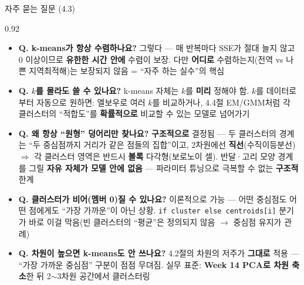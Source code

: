 \begin{frame}[shrink=6]{자주 묻는 질문 (4.3)}
\begin{center}\begin{varwidth}{0.92\textwidth}
  \small
  \begin{itemize}
    \item \textbf{Q. k-means가 항상 수렴하나요?}
      그렇다 --- 매 반복마다 SSE가 절대 늘지 않고 $0$ 이상이므로
      \textbf{유한한 시간 안에} 수렴이 보장. 다만
      \textbf{어디로} 수렴하는지(전역 vs 나쁜 지역최적해)는
      보장되지 않음 = ``자주 하는 실수''의 핵심
    \item \textbf{Q. $k$를 몰라도 쓸 수 있나요?}
      k-means 자체는 $k$를 \textbf{미리} 정해야 함.
      $k$를 데이터로부터 자동으로 원하면: 엘보우로 여러 $k$를
      비교하거나, 4.4절 EM/GMM처럼 각 클러스터의 ``적합도''를
      \textbf{확률적으로} 비교할 수 있는 모델로 넘어가기
    \item \textbf{Q. 왜 항상 ``원형'' 덩어리만 찾나요?}
      \textbf{구조적으로} 결정됨 --- 두 클러스터의 경계는
      ``두 중심점까지 거리가 같은 점들의 집합''이고, 2차원에선
      \textbf{직선}(수직이등분선) $\Rightarrow$ 각 클러스터 영역은
      반드시 \textbf{볼록} 다각형(보로노이 셀). 반달·고리 모양
      경계를 그릴 \textbf{자유 자체가 모델 안에 없음} ---
      파라미터 튜닝으로 극복할 수 없는 \textbf{구조적} 한계
    \item \textbf{Q. 클러스터가 비어(멤버 0)질 수 있나요?}
      이론적으로 가능 --- 어떤 중심점도 어떤 점에게도 ``가장
      가까운''이 아닌 상황. \texttt{if cluster else
      centroids[i]} 분기가 바로 이걸 막음(빈 클러스터의
      ``평균''은 정의되지 않음 $\to$ 중심점 유지가 관례)
    \item \textbf{Q. 차원이 높으면 k-means도 안 쓰나요?}
      4.2절의 차원의 저주가 \textbf{그대로} 적용 --- ``가장
      가까운 중심점'' 구분이 점점 무뎌짐. 실무 표준:
      \textbf{Week 14 PCA로 차원 축소}한 뒤 2$\sim$3차원 공간에서
      클러스터링
  \end{itemize}
\end{varwidth}\end{center}
\end{frame}

